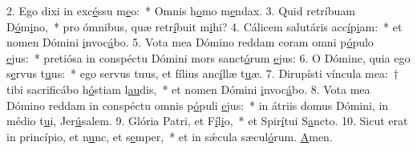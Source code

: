 2. Ego dixi in exc\uline{é}ssu m\uline{e}o:~* Omnis h\uline{o}mo m\uline{e}ndax.
3. Quid retríbuam D\uline{ó}m\uline{i}no,~* pro ómnibus, quæ retr\uline{í}buit m\uline{i}hi?
4. Cálicem salutáris acc\uline{í}p\uline{i}am:~* et nomen Dómini \uline{i}nvoc\uline{á}bo.
5. Vota mea Dómino reddam coram omni p\uline{ó}pulo \uline{e}jus:~* pretiósa in conspéctu Dómini mors sanct\uline{ó}rum \uline{e}jus:
6. O Dómine, quia ego s\uline{e}rvus t\uline{u}us:~* ego servus tuus, et fílius anc\uline{í}llæ t\uline{u}æ.
7. Dirupísti víncula mea:~† tibi sacrificábo h\uline{ó}stiam l\uline{au}dis,~* et nomen Dómini \uline{i}nvoc\uline{á}bo.
8. Vota mea Dómino reddam in conspéctu omnis p\uline{ó}puli \uline{e}jus:~* in átriis domus Dómini, in médio t\uline{u}i, Jer\uline{ú}salem.
9. Glória Patri, et F\uline{í}l\uline{i}o,~* et Spir\uline{í}tui S\uline{a}ncto.
10. Sicut erat in princípio, et n\uline{u}nc, et s\uline{e}mper,~* et in sǽcula sæcul\uline{ó}rum. \uline{A}men.
